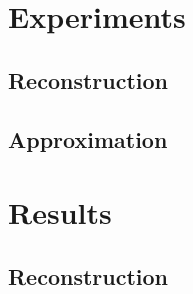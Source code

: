 \documentclass[runningheads, a4paper]{llncs}
\begin{document}
\section{Experiments}

\subsection{Reconstruction}
\subsection{Approximation}

\section{Results}


\subsection{Reconstruction}







\end{document}
